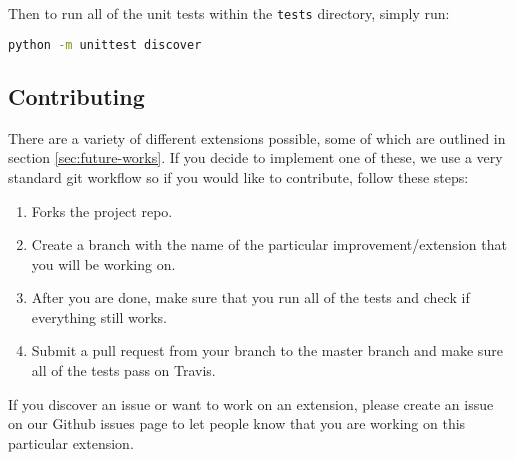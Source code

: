 Then to run all of the unit tests within the \texttt{tests} directory, simply run:
\begin{lstlisting}[language=Bash]
python -m unittest discover
\end{lstlisting}

\subsection{Contributing}

There are a variety of different extensions possible, some of which are outlined in section \ref{sec:future-works}.
If you decide to implement one of these, we use a very standard git workflow so if you would like to contribute, follow these steps:

\begin{enumerate}
  \item Forks the project repo.
  \item Create a branch with the name of the particular improvement/extension that you will be working on.
  \item After you are done, make sure that you run all of the tests and check if everything still works.
  \item Submit a pull request from your branch to the master branch and make sure all of the tests pass on Travis.
\end{enumerate}

If you discover an issue or want to work on an extension, please create an issue on our Github issues page to let people know that you are working on this particular extension.

\endgroup
